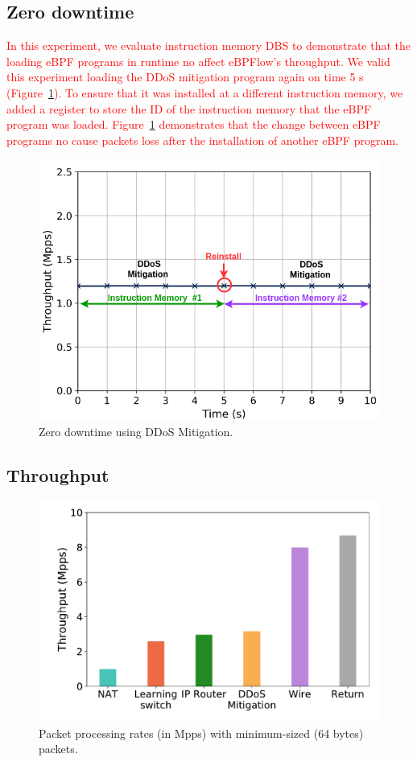 \subsection{Zero downtime}

\textcolor{red}{In this experiment, we evaluate instruction memory DBS to demonstrate that the loading eBPF programs in runtime no affect eBPFlow's throughput. We valid this experiment loading the DDoS mitigation program again on time 5 s (Figure~\ref{fig:zerodowntime}). To ensure that it was installed at a different instruction memory, we added a register to store the ID of the instruction memory that the eBPF program was loaded. Figure~\ref{fig:zerodowntime} demonstrates that the change between eBPF programs no cause packets loss after the installation of another eBPF program.}

\begin{figure}[ht]
\centering
\includegraphics[width=.8\linewidth]{figures/zerodowntime.png}
\caption{Zero downtime using DDoS Mitigation.}
\label{fig:zerodowntime}
\end{figure}

\subsection{Throughput}

\begin{figure}[ht]
\centering
\includegraphics[width=\columnwidth]{figures/throughput_mpps_64B.pdf}
\caption{Packet processing rates (in Mpps) with minimum-sized (64 bytes) packets.}
\label{fig:throughput64}
\end{figure}

